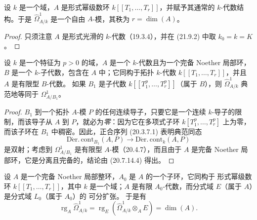 \begin{corollary}[21.9.3]
\label{0.21.9.3-fr}
设 $k$ 是一个域，$A$ 是形式幂级数环 $k[[T_1,\ldots,T_r]]$，并赋予其通常的
$k$-代数结构。于是 $\widehat\Omega^1_{A/k}$ 是一个自由 $A$-模，其秩为
$r=\dim(A)$。
\end{corollary}

\begin{proof}
只须注意 $A$ 是形式光滑的 $k$-代数（19.3.4），并在 (21.9.2) 中取
$k_0=k=K$。
\end{proof}

\begin{lemma}[21.9.4]
\label{0.21.9.4-fr}
设 $k$ 是一个特征为 $p>0$ 的域，$A$ 是一个 $k$-代数且为一个完备
Noether 局部环，$B$ 是一个 $k$-子代数，包含在 $A$ 中；它同构于拓扑
$k$-代数 $k[[T_1,\ldots,T_r]]$，并且 $A$ 是有限型 $B$-代数。
如果 $B_1$ 是子代数 $k[[T_1^p,\ldots,T_r^p]]$（属于 $B$），则
$\widehat\Omega^1_{A/k}$ 典范地等同于 $\Omega^1_{A/B_1}$。
\end{lemma}

\begin{proof}
$B_1$ 到一个拓扑 $A$-模 $P$ 的任何连续导子，只要它是一个连续
$k$-导子的限制，而该导子从 $A$ 到 $P$，就必为\emph{零}：因为它在多项式子环
$k[T_1^p,\ldots,T_r^p]$ 上为零，而该子环在 $B_1$ 中稠密。因此，正合序列
(20.3.7.1) 表明典范同态
\[
  \operatorname{D\acute{e}r.\,cont}_{B_1}(A,P)
  \longrightarrow \operatorname{D\acute{e}r.\,cont}_k(A,P)
\]
是双射；考虑到 $\Omega^1_{A/B_1}$ 是有限型 $A$-模（20.4.7），而且由于
$A$ 是完备 Noether 局部环，它是分离且完备的，结论由 (20.7.14.4) 得出。
\end{proof}

\begin{proposition}[21.9.5]
\label{0.21.9.5-fr}
设 $A$ 是一个完备 Noether 局部整环，$A_0$ 是 $A$ 的一个子环，它同构于
形式幂级数环 $k[[T_1,\ldots,T_r]]$，其中 $k$ 是一个域；$A$ 是有限
$A_0$-代数，而分式域 $E$（属于 $A$）是分式域 $L_0$（属于 $A_0$）的
可分扩张。
于是有
\begin{equation}
\tag{21.9.5.1}
\label{0.21.9.5.1-fr}
  \operatorname{rg}_A\widehat\Omega^1_{A/k}
  =\operatorname{rg}_E(\widehat\Omega^1_{A/k}\otimes_AE)=\dim(A).
\end{equation}
\end{proposition}

